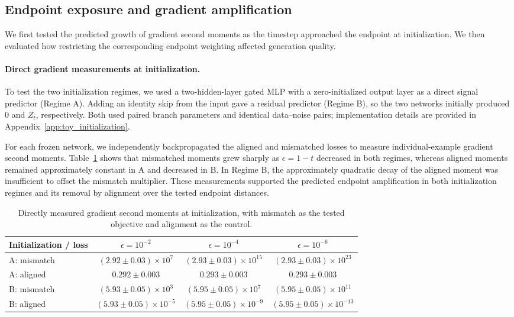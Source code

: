 \documentclass{article}
\theoremstyle{plain}
\theoremstyle{definition}
\theoremstyle{remark}
\begin{document}
\subsection{Endpoint exposure and gradient amplification}
\label{sec:empirical_amplification}

We first tested the predicted growth of gradient second moments as the timestep approached the endpoint at initialization. We then evaluated how restricting the corresponding endpoint weighting affected generation quality.

\paragraph{Direct gradient measurements at initialization.}
To test the two initialization regimes, we used a two-hidden-layer gated MLP with a zero-initialized output layer as a direct signal predictor (Regime A). Adding an identity skip from the input gave a residual predictor (Regime B), so the two networks initially produced $0$ and $Z_t$, respectively. Both used paired branch parameters and identical data--noise pairs; implementation details are provided in Appendix~\ref{app:toy_initialization}.

For each frozen network, we independently backpropagated the aligned and mismatched losses to measure individual-example gradient second moments. Table~\ref{tab:toy_initialization} shows that mismatched moments grew sharply as $\epsilon=1-t$ decreased in both regimes, whereas aligned moments remained approximately constant in A and decreased in B. In Regime B, the approximately quadratic decay of the aligned moment was insufficient to offset the mismatch multiplier. These measurements supported the predicted endpoint amplification in both initialization regimes and its removal by alignment over the tested endpoint distances.

\begin{table}[hbt!]
\small
\centering
\caption{Directly measured gradient second moments at initialization, with mismatch as the tested objective and alignment as the control.}
\label{tab:toy_initialization}
\setlength{\tabcolsep}{5pt}
\renewcommand{\arraystretch}{1.15}
\begin{tabular}{lccc}
\toprule
Initialization / loss & $\epsilon=10^{-2}$ & $\epsilon=10^{-4}$ & $\epsilon=10^{-6}$ \\
\midrule
A: mismatch & $(2.92\pm0.03)\times10^{7}$ & $(2.93\pm0.03)\times10^{15}$ & $(2.93\pm0.03)\times10^{23}$ \\
A: aligned & $0.292\pm0.003$ & $0.293\pm0.003$ & $0.293\pm0.003$ \\
\midrule
B: mismatch & $(5.93\pm0.05)\times10^{3}$ & $(5.95\pm0.05)\times10^{7}$ & $(5.95\pm0.05)\times10^{11}$ \\
B: aligned & $(5.93\pm0.05)\times10^{-5}$ & $(5.95\pm0.05)\times10^{-9}$ & $(5.95\pm0.05)\times10^{-13}$ \\
\bottomrule
\end{tabular}

\end{table}
\end{document}
